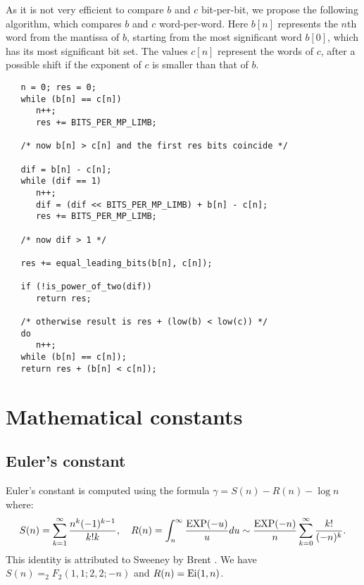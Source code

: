 \documentclass[12pt]{amsart}
\def\exp{{\rm EXP}}
\begin{document}
As it is not very efficient to compare $b$ and $c$ bit-per-bit, we propose
the following algorithm, which compares $b$ and $c$ word-per-word.
Here $b[n]$ represents the $n$th word from the mantissa of $b$, starting from
the most significant word $b[0]$, which has its most significant bit set.
The values $c[n]$ represent the words of $c$, after a possible shift if the
exponent of $c$ is smaller than that of $b$.
\begin{verbatim}
   n = 0; res = 0;
   while (b[n] == c[n])
      n++;
      res += BITS_PER_MP_LIMB;

   /* now b[n] > c[n] and the first res bits coincide */

   dif = b[n] - c[n];
   while (dif == 1)
      n++;
      dif = (dif << BITS_PER_MP_LIMB) + b[n] - c[n];
      res += BITS_PER_MP_LIMB;

   /* now dif > 1 */

   res += equal_leading_bits(b[n], c[n]);

   if (!is_power_of_two(dif))
      return res;

   /* otherwise result is res + (low(b) < low(c)) */
   do
      n++;
   while (b[n] == c[n]);
   return res + (b[n] < c[n]);
\end{verbatim}

\section{Mathematical constants}

\subsection{Euler's constant}

Euler's constant is computed using the formula $\gamma = S(n) - R(n) - \log n$
where:
\[ S(n) = \sum_{k=1}^{\infty} \frac{n^k (-1)^{k-1}}{k! k}, \quad
   R(n) = \int_n^{\infty} \frac{\exp(-u)}{u} du \sim \frac{\exp(-n)}{n}
        \sum_{k=0}^{\infty} \frac{k!}{(-n)^k}. \]
This identity is attributed to Sweeney by Brent \cite{Brent78}.
We have $S(n) = _2 F_2(1,1;2,2;-n)$ and $R(n) = {\rm Ei}(1, n)$.
\end{document}
